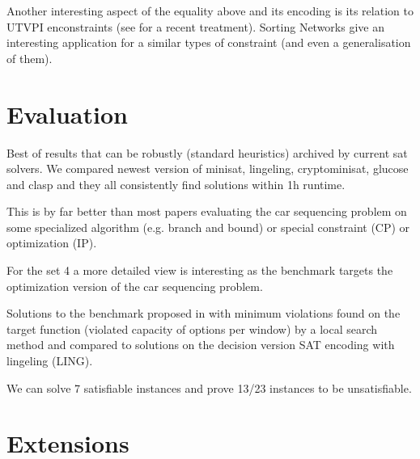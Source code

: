 \documentclass[]{llncs}
\begin{document}
Another interesting aspect of the equality above and its encoding is its
relation to UTVPI enconstraints (see \cite{Seshia07} for a recent
treatment). Sorting Networks give an interesting application for a
similar types of constraint (and even a generalisation of them). 


\section{Evaluation}

Best of results that can be robustly (standard heuristics) archived by
current sat solvers. We compared newest version of minisat, lingeling,
cryptominisat, glucose and clasp and they all consistently find
solutions within 1h runtime. 
\DTLsetseparator{,}

\begin{table}[htbp]
    \caption{}
    \centering
\end{table}


This is by far better than most papers evaluating the car sequencing
problem on some specialized algorithm (e.g. branch and bound) or special
constraint (CP) or optimization (IP). 

For the set 4 a more detailed view is interesting as the benchmark
targets the optimization version of the car sequencing problem. 

\DTLsetseparator{,}

\begin{table}[htbp]
    \caption{Solutions to the benchmark proposed in \cite{Gravel05} with
    minimum violations found on the target function (violated capacity
of options per window) by a local search method and compared to
solutions on the decision version  SAT encoding with lingeling (LING). }
    \centering
\end{table}


We can solve 7 satisfiable instances and prove 13/23 instances to be
unsatisfiable. 


\section{Extensions}
\end{document}
